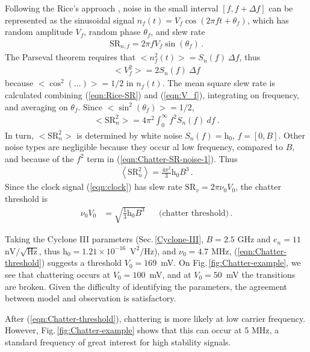 \documentclass{article}
\newcommand{\unit}[1]{\ensuremath{\mathrm{#1}}}
\newcommand{\req}[1]{(\ref{#1})}
\begin{document}
Following the Rice's approach
\cite{Rice-1944-BSTJ,Rice-1945-BSTJ},
noise in the small interval $[f, f+\Delta f]$ can be represented as the sinusoidal signal $n_f(t)=V_f\cos(2\pi ft+\theta_f)$, which has random amplitude $V_f$, random phase $\theta_f$, and slew rate
\begin{gather}
\mathrm{SR}_{n,f}=2\pi fV_f \sin(\theta_f)\,.
\label{eqn:Rice-SR}
\end{gather}
The Parseval theorem requires that $\bigl<n^2_f(t)\bigr>=S_{n}(f)\:\Delta f$, thus
\begin{gather}
\bigl<V^2_f\bigr>=2S_n(f)\:\Delta f
\label{eqn:V_f}
\end{gather}
because $\bigl<\cos^2(\dots)\bigr>=1/2$ in $n_f(t)$.  The mean square slew rate
is calculated combining \req{eqn:Rice-SR} and 
\req{eqn:V_f}, integrating on frequency, and averaging on $\theta_f$.  Since $\bigl<\sin^2(\theta_f)\bigr>=1/2$, 
\begin{gather}
\bigl<\mathrm{SR}_n^2\bigr>=4\pi^2\int_0^\infty f^2S_n(f)\:df~.
\label{eqn:Chatter-SR-noise-1}
\end{gather}
In turn, $\bigl<\mathrm{SR}_n^2\bigr>$ is determined by white noise $S_n(f)=\mathrm{h}_0$, $f=[0,B]$.  Other noise types are negligible because they occur al low frequency, compared to $B$, and because of the $f^2$ term in \req{eqn:Chatter-SR-noise-1}.  Thus
\begin{gather}
\left<\mathrm{SR}_n^2\right>=\frac{4\pi^2}{3}\mathrm{h}_0 B^3\,.
\label{eqn:Chatter-SR-noise}
\end{gather}
Since the clock signal \req{eqn:clock} has slew rate $\mathrm{SR}_v=2\pi\nu_0V_0$, the chatter threshold is 
\begin{align}
\nu_0V_0&= \sqrt{\frac{1}{3}\mathrm{h}_0B^3}&&\text{(chatter threshold)}
\label{eqn:Chatter-threshold}\,.
\end{align}

Taking the Cyclone III parameters (Sec.\,\ref{Cyclone-III}, $B=2.5$ GHz and $e_n=11$ \unit{nV/\sqrt{Hz}}, thus $\mathrm{h}_0=1.21{\times}10^{-16}$~\unit{V^2/Hz}), and  $\nu_0=4.7$ MHz, \req{eqn:Chatter-threshold} suggests a threshold $V_0=169$~mV\@.  On Fig.\,\ref{fig:Chatter-example}, we see that chattering occurs at $V_0=100$~mV, and at $V_0=50$~mV the transitions are broken.
Given the difficulty of identifying the parameters,  the agreement between model and observation is satisfactory.

After \req{eqn:Chatter-threshold}, chattering is more likely at low carrier frequency.  However, Fig.\,\ref{fig:Chatter-example} shows that this can occur at 5 MHz, a standard frequency of great interest for high stability signals.
\end{document}

